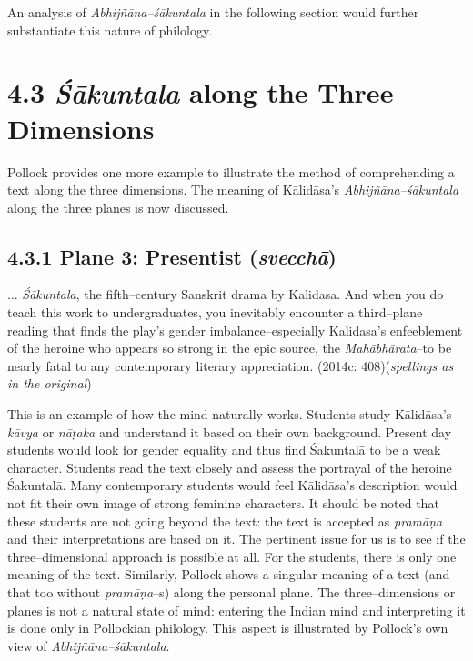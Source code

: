 An analysis of \textit{Abhijñāna–śākuntala} in the following section would further substantiate this nature of philology.


\section*{4.3 {\it {\bfseries Śākuntala}} along the Three Dimensions}

Pollock provides one more example to illustrate the method of comprehending a text along the three dimensions. The meaning of Kālidāsa’s \textit{Abhijñāna–śākuntala} along the three planes is now discussed.

\subsection*{4.3.1 Plane 3: Presentist ({\it {\bfseries svecchā}})}

\begin{myquote}
... \textit{Śākuntala}, the fifth–century Sanskrit drama by Kalidasa. And when you do teach this work to undergraduates, you inevitably encounter a third–plane reading that finds the play’s gender imbalance–especially Kalidasa’s enfeeblement of the heroine who appears so strong in the epic source, the \textit{Mahābhārata}–to be nearly fatal to any contemporary literary appreciation. (2014c: 408)(\textit{spellings as in the original})
\end{myquote}

This is an example of how the mind naturally works. Students study Kālidāsa’s \textit{kāvya} or \textit{nāṭaka} and understand it based on their own background. Present day students would look for gender equality and thus find Śakuntalā to be a weak character. Students read the text closely and assess the portrayal of the heroine Śakuntalā. Many contemporary students would feel Kālidāsa’s description would not fit their own image of strong feminine characters. It should be noted that these students are not going beyond the text: the text is accepted as \textit{pramāṇa} and their interpretations are based on it. The pertinent issue for us is to see if the three–dimensional approach is possible at all. For the students, there is only one meaning of the text. Similarly, Pollock shows a singular meaning of a text (and that too without \textit{pramāṇa}–s) along the personal plane. The three–dimensions or planes is not a natural state of mind: entering the Indian mind and interpreting it is done only in Pollockian philology. This aspect is illustrated by Pollock’s own view of \textit{Abhijñāna–śākuntala}.

